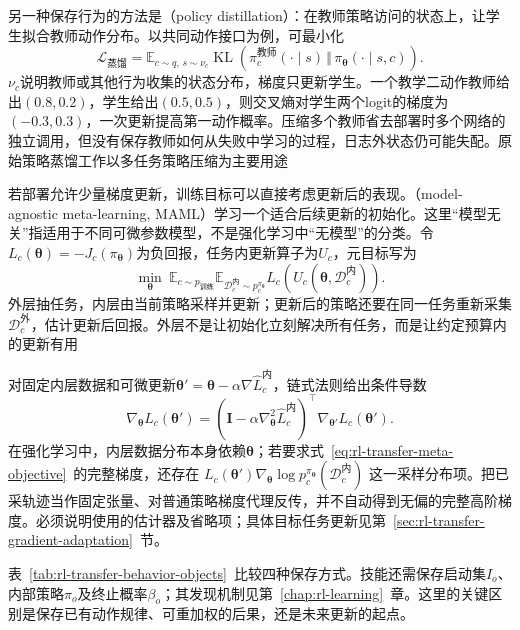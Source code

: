 另一种保存行为的方法是（policy distillation）：在教师策略访问的状态上，让学生拟合教师动作分布。以共同动作接口为例，可最小化
\[
 \mathcal L_{\text{蒸馏}}=
 \mathbb E_{c\sim q,\,s\sim\nu_c}
 \operatorname{KL}\!\left(\pi_c^{\text{教师}}(\cdot\mid s)
       \,\Vert\,\pi_{\bm\theta}(\cdot\mid s,c)\right).
\]
$\nu_c$说明教师或其他行为收集的状态分布，梯度只更新学生。一个教学二动作教师给出$(0.8,0.2)$，学生给出$(0.5,0.5)$，则交叉熵对学生两个logit的梯度为$(-0.3,0.3)$，一次更新提高第一动作概率。压缩多个教师省去部署时多个网络的独立调用，但没有保存教师如何从失败中学习的过程，日志外状态仍可能失配。原始策略蒸馏工作以多任务策略压缩为主要用途

若部署允许少量梯度更新，训练目标可以直接考虑更新后的表现。（model-agnostic meta-learning, MAML）学习一个适合后续更新的初始化。这里“模型无关”指适用于不同可微参数模型，不是强化学习中“无模型”的分类。令$L_c(\bm\theta)=-J_c(\pi_{\bm\theta})$为负回报，任务内更新算子为$U_c$，元目标写为
\begin{equation}
 \min_{\bm\theta}\ %
 \mathbb E_{c\sim p_{\text{训练}}}
 \mathbb E_{\mathcal D_c^{\text{内}}\sim p_c^{\pi_{\bm\theta}}}
 L_c\!\left(U_c(\bm\theta,\mathcal D_c^{\text{内}})\right).
 \label{eq:rl-transfer-meta-objective}
\end{equation}
外层抽任务，内层由当前策略采样并更新；更新后的策略还要在同一任务重新采集$\mathcal D_c^{\text{外}}$，估计更新后回报。外层不是让初始化立刻解决所有任务，而是让约定预算内的更新有用

对固定内层数据和可微更新$\bm\theta'=\bm\theta-\alpha\nabla\widehat L_c^{\text{内}}$，链式法则给出条件导数
\[
 \nabla_{\bm\theta}L_c(\bm\theta')
 =\left(\bm I-\alpha\nabla_{\bm\theta}^2\widehat L_c^{\text{内}}\right)^\top
       \nabla_{\bm\theta'}L_c(\bm\theta').
\]
在强化学习中，内层数据分布本身依赖$\bm\theta$；若要求式~\eqref{eq:rl-transfer-meta-objective}~的完整梯度，还存在
$L_c(\bm\theta')\nabla_{\bm\theta}\log p_c^{\pi_{\bm\theta}}(\mathcal D_c^{\text{内}})$
这一采样分布项。把已采轨迹当作固定张量、对普通策略梯度代理反传，并不自动得到无偏的完整高阶梯度。必须说明使用的估计器及省略项；具体目标任务更新见第~\ref{sec:rl-transfer-gradient-adaptation}~节。

表~\ref{tab:rl-transfer-behavior-objects}~比较四种保存方式。技能还需保存启动集$I_o$、内部策略$\pi_o$及终止概率$\beta_o$；其发现机制见第~\ref{chap:rl-learning}~章。这里的关键区别是保存已有动作规律、可重加权的后果，还是未来更新的起点。

